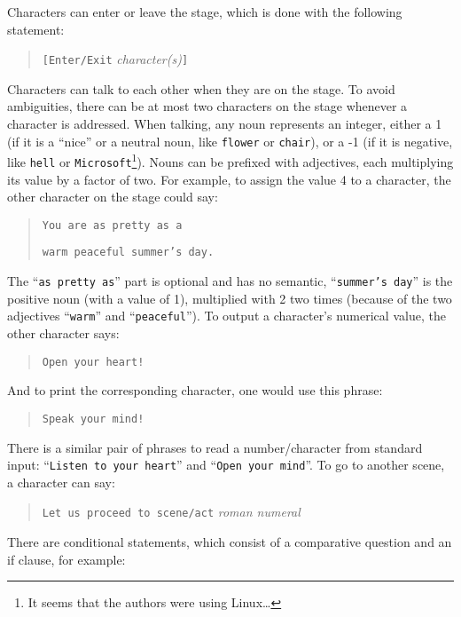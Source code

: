Characters can enter or leave the stage, which is done with the following statement:

\begin{quotation}
    \texttt{[Enter/Exit} \emph{character(s)}\texttt{]}
\end{quotation}

Characters can talk to each other when they are on the stage. To avoid ambiguities, there can be at most two characters on the stage whenever a character is addressed. When talking, any noun represents an integer, either a 1 (if it is a “nice” or a neutral noun, like \texttt{flower} or \texttt{chair}), or a -1 (if it is negative, like \texttt{hell} or \texttt{Microsoft}\footnote{It seems that the authors were using Linux\dots}). Nouns can be prefixed with adjectives, each multiplying its value by a factor of two. For example, to assign the value 4 to a character, the other character on the stage could say:

\begin{quotation}
    \texttt{You are as pretty as a}

    \texttt{warm peaceful summer's day.}
\end{quotation}

The “\texttt{as pretty as}” part is optional and has no semantic, “\texttt{summer's day}” is the positive noun (with a value of 1), multiplied with 2 two times (because of the two adjectives “\texttt{warm}” and “\texttt{peaceful}”). To output a character's numerical value, the other character says:

\begin{quotation}
    \texttt{Open your heart!}
\end{quotation}

And to print the corresponding \ascii{} character, one would use this phrase:

\begin{quotation}
    \texttt{Speak your mind!}
\end{quotation}

There is a similar pair of phrases to read a number/character from standard input: “\texttt{Listen to your heart}” and “\texttt{Open your mind}”. To go to another scene, a character can say:

\begin{quotation}
    \texttt{Let us proceed to scene/act} \emph{roman numeral}
\end{quotation}

There are conditional statements, which consist of a comparative question and an if clause, for example:


